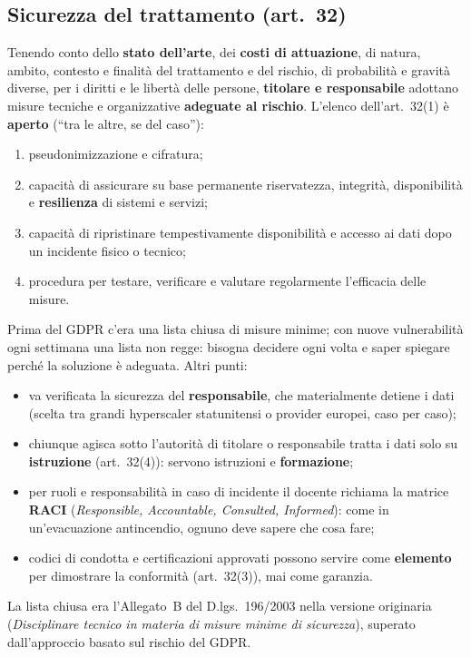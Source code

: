 \subsection{Sicurezza del trattamento (art.~32)}
Tenendo conto dello \textbf{stato dell'arte}, dei \textbf{costi di attuazione}, di natura, ambito,
contesto e finalità del trattamento e del rischio, di probabilità e gravità diverse, per i diritti e le
libertà delle persone, \textbf{titolare e responsabile} adottano misure tecniche e organizzative
\textbf{adeguate al rischio}. L'elenco dell'art.~32(1) è \textbf{aperto} (``tra le altre, se del
caso''):
\begin{enumerate}[label=(\alph*)]
  \item pseudonimizzazione e cifratura;
  \item capacità di assicurare su base permanente riservatezza, integrità, disponibilità e
    \textbf{resilienza} di sistemi e servizi;
  \item capacità di ripristinare tempestivamente disponibilità e accesso ai dati dopo un incidente
    fisico o tecnico;
  \item procedura per testare, verificare e valutare regolarmente l'efficacia delle misure.
\end{enumerate}
Prima del GDPR c'era una lista chiusa di misure minime; con nuove vulnerabilità ogni settimana una lista
non regge: bisogna decidere ogni volta e saper spiegare perché la soluzione è adeguata. Altri punti:
\begin{itemize}
  \item va verificata la sicurezza del \textbf{responsabile}, che materialmente detiene i dati (scelta tra
    grandi hyperscaler statunitensi o provider europei, caso per caso);
  \item chiunque agisca sotto l'autorità di titolare o responsabile tratta i dati solo su
    \textbf{istruzione} (art.~32(4)): servono istruzioni e \textbf{formazione};
  \item per ruoli e responsabilità in caso di incidente il docente richiama la matrice \textbf{RACI}
    (\emph{Responsible, Accountable, Consulted, Informed}): come in un'evacuazione antincendio, ognuno deve
    sapere che cosa fare;
  \item codici di condotta e certificazioni approvati possono servire come \textbf{elemento} per
    dimostrare la conformità (art.~32(3)), mai come garanzia.
\end{itemize}

\begin{integrazione}
La lista chiusa era l'Allegato~B del D.lgs.~196/2003 nella versione originaria (\emph{Disciplinare
tecnico in materia di misure minime di sicurezza}), superato dall'approccio basato sul rischio del GDPR.
\end{integrazione}

